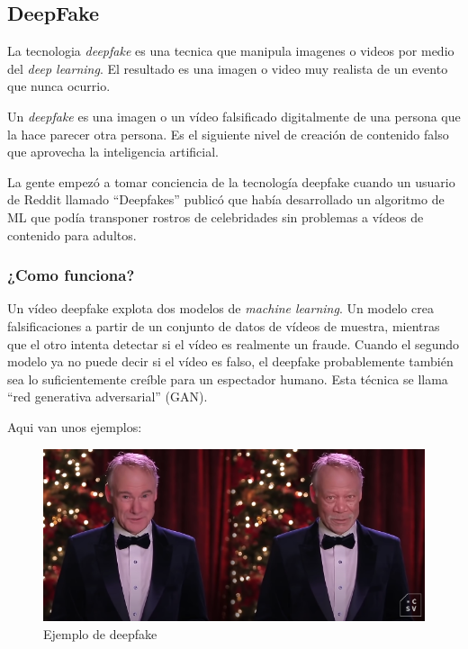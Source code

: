 \documentclass[runningheads]{llncs} %
\begin{document}
\subsection{DeepFake}
La tecnologia \textit{deepfake} es una tecnica que manipula imagenes o videos por medio del 
\textit{deep learning}. El resultado es una imagen o video muy realista de un evento que nunca ocurrio.
\cite{ej-deepfake2}

Un \textit{deepfake} es una imagen o un vídeo falsificado digitalmente de una persona 
que la hace parecer otra persona. Es el siguiente nivel de creación de contenido falso 
que aprovecha la inteligencia artificial. \cite{ej-deepfake2}

La gente empezó a tomar conciencia de la tecnología deepfake cuando un usuario de Reddit 
llamado \textquotedblleft{}Deepfakes\textquotedblright{} publicó que había desarrollado
un algoritmo de ML que podía transponer rostros de celebridades sin problemas
a vídeos de contenido para adultos. \cite{ej-deepfake2}
 
\subsubsection{¿Como funciona?}
Un vídeo deepfake explota dos modelos de \textit{machine learning}. 
Un modelo crea falsificaciones a partir de un conjunto de datos de vídeos de muestra, 
mientras que el otro intenta detectar si el vídeo es realmente un fraude. 
Cuando el segundo modelo ya no puede decir si el vídeo es falso, 
el deepfake probablemente también sea lo suficientemente creíble para un 
espectador humano. 
Esta técnica se llama
\textquotedblleft{}red generativa adversarial\textquotedblright{} (GAN). \cite{ej-deepfake2}

Aqui van unos ejemplos:
\begin{figure}
    \centering
    \includegraphics[scale=0.6]{ej1-deepfake.png}
    \caption{Ejemplo de deepfake \cite{ej-deepfake3}}
    \label{fig:deepfake-ej1}
\end{figure}
\end{document}
